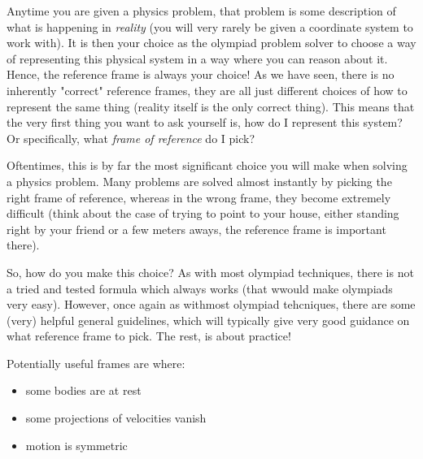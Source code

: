 \documentclass{article}
\begin{document}
Anytime you are given a physics problem, that problem is some description of what is happening in \textit{reality} (you will very rarely be given a coordinate system to work with). It is then your choice as the olympiad problem solver to choose a way of representing this physical system in a way where you can reason about it. Hence, the reference frame is always your choice! As we have seen, there is no inherently "correct" reference frames, they are all just different choices of how to represent the same thing (reality itself is the only correct thing). This means that the very first thing you want to ask yourself is, how do I represent this system? Or specifically, what \textit{frame of reference} do I pick?

Oftentimes, this is by far the most significant choice you will make when solving a physics problem. Many problems are solved almost instantly by picking the right frame of reference, whereas in the wrong frame, they become extremely difficult (think about the case of trying to point to your house, either standing right by your friend or a few meters aways, the reference frame is important there).

So, how do you make this choice? As with most olympiad techniques, there is not a tried and tested formula which always works (that wwould make olympiads very easy). However, once again as withmost olympiad tehcniques, there are some (very) helpful general guidelines, which will typically give very good guidance on what reference frame to pick. The rest, is about practice!

Potentially useful frames are where:
\begin{itemize}
    \item some bodies are at rest
    \item some projections of velocities vanish
    \item motion is symmetric
\end{itemize}
\end{document}
